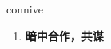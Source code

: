 
\begin{frame}
{\huge connive}
\begin{center}
\begin{enumerate}\Large
  \item \textbf{暗中合作，共谋}
\end{enumerate}
\end{center}
\end{frame}
